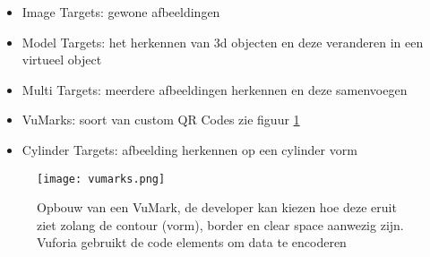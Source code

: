 \begin{itemize}
    \item Image Targets: gewone afbeeldingen
    \item Model Targets: het herkennen van 3d objecten en deze veranderen in een virtueel object
    \item Multi Targets: meerdere afbeeldingen herkennen en deze samenvoegen
    \item VuMarks: soort van custom QR Codes zie figuur \ref{fig:vumarks}
    \item Cylinder Targets: afbeelding herkennen op een cylinder vorm
\end{itemize} 

\begin{figure}
    \texttt{[image: vumarks.png]}
    \caption{Opbouw van een VuMark, de developer kan kiezen hoe deze eruit ziet zolang de contour (vorm), border en clear space aanwezig zijn. Vuforia gebruikt de code elements om data te encoderen}
    \label{fig:vumarks}
\end{figure}

